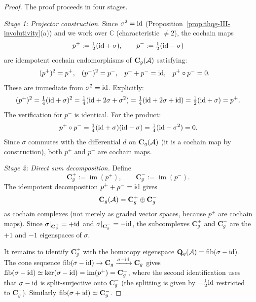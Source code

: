 \begin{proof}
The proof proceeds in four stages.

\emph{Stage 1: Projector construction.}
Since $\sigma^2 = \mathrm{id}$
(Proposition~\ref{prop:thqg-III-involutivity}(a)) and we
work over $\mathbb{C}$ (characteristic $\ne 2$), the cochain
maps
\begin{equation}%
p^+ := \tfrac{1}{2}(\id + \sigma),
\qquad
p^- := \tfrac{1}{2}(\id - \sigma)
\end{equation}
are idempotent cochain endomorphisms of $\mathbf{C}_g(\mathcal{A})$
satisfying:
\begin{align}
(p^+)^2 &= p^+, &
(p^-)^2 &= p^-, &
p^+ + p^- &= \mathrm{id}, &
p^+ \circ p^- &= 0.
\end{align}
These are immediate from $\sigma^2 = \mathrm{id}$. Explicitly:
\[
(p^+)^2
= \tfrac{1}{4}(\mathrm{id} + \sigma)^2
= \tfrac{1}{4}(\mathrm{id} + 2\sigma + \sigma^2)
= \tfrac{1}{4}(\mathrm{id} + 2\sigma + \mathrm{id})
= \tfrac{1}{2}(\mathrm{id} + \sigma)
= p^+.
\]
The verification for $p^-$ is identical. For the product:
\[
p^+ \circ p^-
= \tfrac{1}{4}(\mathrm{id} + \sigma)(\mathrm{id} - \sigma)
= \tfrac{1}{4}(\mathrm{id} - \sigma^2)
= 0.
\]
Since $\sigma$ commutes with the differential
$d$ on $\mathbf{C}_g(\mathcal{A})$ (it is a cochain map by
construction), both $p^+$ and $p^-$ are cochain maps.

\emph{Stage 2: Direct sum decomposition.}
Define
\[
\mathbf{C}_g^+ := \operatorname{im}(p^+),
\qquad
\mathbf{C}_g^- := \operatorname{im}(p^-).
\]
The idempotent decomposition $p^+ + p^- = \mathrm{id}$ gives
\begin{equation}%
\mathbf{C}_g(\cA) = \mathbf{C}_g^+ \oplus \mathbf{C}_g^-
\end{equation}
as cochain complexes (not merely as graded vector spaces,
because $p^\pm$ are cochain maps). Since
$\sigma|_{\mathbf{C}_g^+} = +\mathrm{id}$ and
$\sigma|_{\mathbf{C}_g^-} = -\mathrm{id}$, the subcomplexes
$\mathbf{C}_g^+$ and $\mathbf{C}_g^-$ are the $+1$ and $-1$
eigenspaces of $\sigma$.

It remains to identify $\mathbf{C}_g^+$ with the homotopy
eigenspace $\mathbf{Q}_g(\mathcal{A}) = \operatorname{fib}(\sigma - \mathrm{id})$.
The cone sequence
$\operatorname{fib}(\sigma - \mathrm{id}) \to \mathbf{C}_g
\xrightarrow{\sigma - \mathrm{id}} \mathbf{C}_g$
gives $\operatorname{fib}(\sigma - \mathrm{id}) \simeq
\ker(\sigma - \mathrm{id}) = \operatorname{im}(p^+) = \mathbf{C}_g^+$,
where the second identification uses that $\sigma - \mathrm{id}$ is
split-surjective onto $\mathbf{C}_g^-$ (the splitting is given
by $-\tfrac{1}{2}\mathrm{id}$ restricted to $\mathbf{C}_g^-$).
Similarly $\operatorname{fib}(\sigma + \mathrm{id}) \simeq \mathbf{C}_g^-$.


\end{proof}
